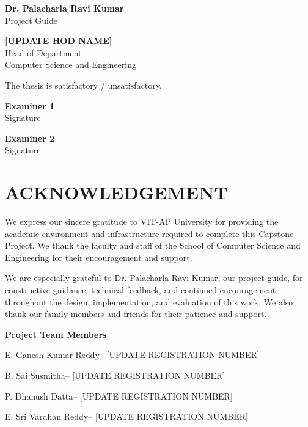 \documentclass[12pt,a4paper,oneside]{report}
\newcommand{\guide}{Dr. Palacharla Ravi Kumar}
\newcommand{\department}{Computer Science and Engineering}
\newcommand{\studentone}{E. Ganesh Kumar Reddy}
\newcommand{\studenttwo}{B. Sai Susmitha}
\newcommand{\studentthree}{P. Dhanush Datta}
\newcommand{\studentfour}{E. Sri Vardhan Reddy}
\begin{document}
\vspace{1.4in}
\noindent\begin{minipage}[t]{0.45\textwidth}
\textbf{\guide}\\
Project Guide
\end{minipage}\hfill
\begin{minipage}[t]{0.40\textwidth}
\textbf{[UPDATE HOD NAME]}\\
Head of Department\\
\department
\end{minipage}

\vfill
\noindent The thesis is satisfactory / unsatisfactory.\\[0.7in]
\noindent\begin{minipage}[t]{0.42\textwidth}\textbf{Examiner 1}\\[0.35in]Signature\end{minipage}\hfill
\begin{minipage}[t]{0.42\textwidth}\textbf{Examiner 2}\\[0.35in]Signature\end{minipage}
\clearpage

\chapter*{ACKNOWLEDGEMENT}
We express our sincere gratitude to VIT-AP University for providing the academic environment and infrastructure required to complete this Capstone Project. We thank the faculty and staff of the School of Computer Science and Engineering for their encouragement and support.

We are especially grateful to \guide, our project guide, for constructive guidance, technical feedback, and continued encouragement throughout the design, implementation, and evaluation of this work. We also thank our family members and friends for their patience and support.

\vspace{0.35in}
\noindent\textbf{Project Team Members}\par
\noindent \studentone -- [UPDATE REGISTRATION NUMBER]\par
\noindent \studenttwo -- [UPDATE REGISTRATION NUMBER]\par
\noindent \studentthree -- [UPDATE REGISTRATION NUMBER]\par
\noindent \studentfour -- [UPDATE REGISTRATION NUMBER]
\clearpage
\end{document}
